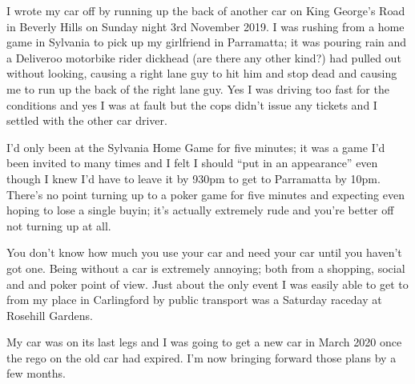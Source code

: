 I wrote my car off by running up the back of another car on King
George's Road in Beverly Hills on Sunday night 3rd November 2019.
I was rushing from a home game in Sylvania to pick up my girlfriend in
Parramatta; it was pouring rain and a Deliveroo motorbike
rider dickhead (are there any other kind?) had pulled out without
looking, causing a right lane guy to hit him and stop dead and causing
me to run up the back of the right lane guy. Yes I was driving too
fast for the conditions and yes I was at fault but the cops didn't
issue any tickets and I settled with the other car driver.

I'd only been at the Sylvania Home Game for five minutes; it was a
game I'd been invited to many times and I felt I should ``put in an
appearance'' even though I knew I'd have to leave it by 930pm to get
to Parramatta by 10pm. There's no point turning up to a poker game for
five minutes and expecting even hoping to lose a single buyin; it's
actually extremely rude and you're better off not turning up at all.

You don't know how much you use your car and need your car until you
haven't got one. Being without a car is extremely annoying; both from
a shopping, social and and poker point of view. Just about the only
event I was easily able to get to from my place in Carlingford by
public transport was a Saturday raceday at Rosehill Gardens.

My car was on its last legs and I was going to get a new car in March
2020 once the rego on the old car had expired. I'm now bringing
forward those plans by a few months.
